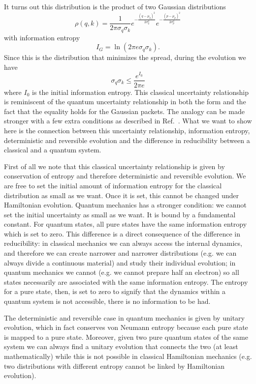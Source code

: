 \documentclass{ws-ijqi}
\begin{document}
It turns out this distribution is the product of two Gaussian distributions
\begin{equation}
\rho(q,k) = \frac{1}{2\pi\sigma_q\sigma_k} e^{- \frac{(q - \mu_q)^2}{2 \sigma_q^2}} e^{- \frac{(p - \mu_p)^2}{2 \sigma_p^2}}
\end{equation}
with information entropy
\begin{equation}
I_G = \ln (2 \pi e \sigma_q \sigma_k).
\end{equation}
Since this is the distribution that minimizes the spread, during the evolution we have
\begin{equation}
\sigma_q \sigma_k \leq \frac{e^{I_0}}{2 \pi e}
\end{equation}
where $I_0$ is the initial information entropy. This classical uncertainty relationship is reminiscent of the quantum uncertainty relationship in both the form and the fact that the equality holds for the Gaussian packets. The analogy can be made stronger with a few extra conditions as described in Ref.~. What we want to show here is the connection between this uncertainty relationship, information entropy, deterministic and reversible evolution and the difference in reducibility between a classical and a quantum system.

First of all we note that this classical uncertainty relationship is given by conservation of entropy and therefore deterministic and reversible evolution. We are free to set the initial amount of information entropy for the classical distribution as small as we want. Once it is set, this cannot be changed under Hamiltonian evolution. Quantum mechanics has a stronger condition: we cannot set the initial uncertainty as small as we want. It is bound by a fundamental constant. For quantum states, all pure states have the same information entropy which is set to zero. This difference is a direct consequence of the difference in reducibility: in classical mechanics we can always access the internal dynamics, and therefore we can create narrower and narrower distributions (e.g. we can always divide a continuous material) and study their individual evolution; in quantum mechanics we cannot (e.g. we cannot prepare half an electron) so all states necessarily are associated with the same information entropy. The entropy for a pure state, then, is set to zero to signify that the dynamics within a quantum system is not accessible, there is no information to be had.

The deterministic and reversible case in quantum mechanics is given by unitary evolution, which in fact conserves von Neumann entropy because each pure state is mapped to a pure state. Moreover, given two pure quantum states of the same system we can always find a unitary evolution that connects the two (at least mathematically) while this is not possible in classical Hamiltonian mechanics (e.g. two distributions with different entropy cannot be linked by Hamiltonian evolution).
\end{document}
